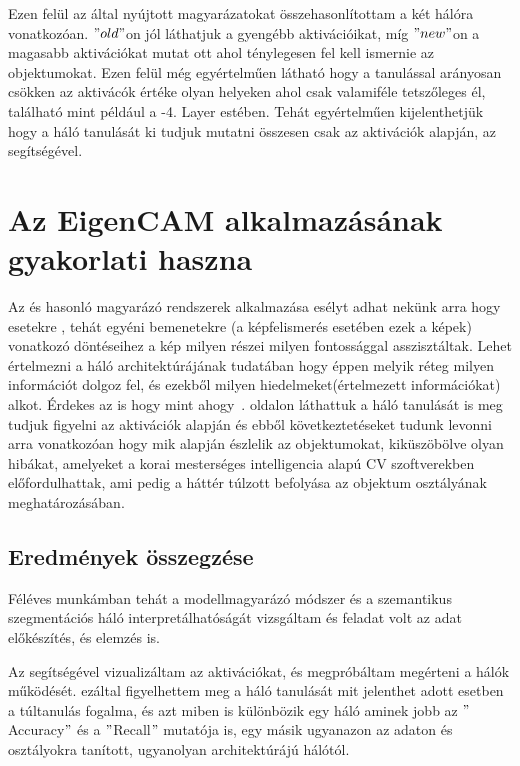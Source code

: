 \documentclass[12pt,oneside,a4paper]{article}
\newcommand{\newsection}[1]{\clearpage\section{#1}}\label{makro}
\theoremstyle{remark}
\newcommand{\oldh}{\( "old" \)}\label{makro2}
\newcommand{\newh}{\( "new" \)}
\begin{document}
Ezen felül az  által nyújtott magyarázatokat összehasonlítottam a két hálóra vonatkozóan.
\oldh on jól láthatjuk a gyengébb aktivációikat, míg \newh on a magasabb aktivációkat mutat ott ahol ténylegesen fel kell
ismernie az objektumokat.
Ezen felül még egyértelműen látható hogy a tanulással arányosan csökken az aktivácók értéke olyan helyeken ahol csak valamiféle
tetszőleges él, található mint például a -4. Layer estében.
Tehát egyértelműen kijelenthetjük hogy a háló tanulását ki tudjuk mutatni összesen csak az aktivációk alapján, az
 segítségével.

\newsection{Az EigenCAM alkalmazásának gyakorlati haszna}\label{sec:az-eigencam-alkalmazasanak-gyakorlati-haszna}
    Az és hasonló magyarázó rendszerek alkalmazása esélyt adhat nekünk arra hogy esetekre
    , tehát egyéni bemenetekre (a képfelismerés esetében ezek a képek) vonatkozó döntéseihez a kép milyen részei
    milyen fontossággal asszisztáltak.
    Lehet értelmezni a háló architektúrájának tudatában hogy éppen melyik réteg milyen információt dolgoz fel,
    és ezekből milyen hiedelmeket(értelmezett információkat) alkot.
    Érdekes az is hogy mint ahogy~\pageref{subsec:magyarazat}. oldalon láthattuk a háló tanulását is meg tudjuk
    figyelni az aktivációk alapján és ebből következtetéseket tudunk levonni arra vonatkozóan hogy mik alapján észlelik
    az objektumokat, kiküszöbölve olyan hibákat, amelyeket a korai mesterséges intelligencia  alapú \ac{CV} szoftverekben előfordulhattak, ami pedig a háttér
    túlzott befolyása az objektum osztályának meghatározásában.

\subsection{Eredmények összegzése}\label{subsec:osszegzes-es-kovetkeztetes}
    Féléves munkámban tehát a  modellmagyarázó módszer és a  szemantikus szegmentációs háló
    interpretálhatóságát vizsgáltam és feladat volt az adat előkészítés, és elemzés is.

    Az  segítségével vizualizáltam az aktivációkat, és megpróbáltam megérteni a hálók működését.
    ezáltal figyelhettem meg a háló tanulását mit jelenthet adott esetben a túltanulás fogalma, és azt miben is
    különbözik egy háló aminek jobb az \("\)Accuracy\("\) és a \("\)Recall\("\) mutatója is, egy másik ugyanazon az adaton és
    osztályokra tanított, ugyanolyan architektúrájú hálótól.
\end{document}
